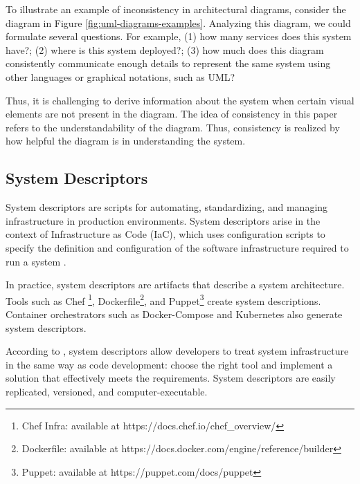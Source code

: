 \documentclass[sigconf]{acmart}
\begin{document}
To illustrate an example of inconsistency in architectural diagrams, consider the diagram in Figure \ref{fig:uml-diagrams-examples}. Analyzing this diagram, we could formulate several questions. For example, (1) how many services does this system have?; (2) where is this system deployed?; (3) how much does this diagram consistently communicate enough details to represent the same system using other languages or graphical notations, such as UML?

Thus, it is challenging to derive information about the system when certain visual elements are not present in the diagram. The idea of consistency in this paper refers to the understandability of the diagram. Thus, consistency is realized by how helpful the diagram is in understanding the system.

\subsection{System Descriptors}

System descriptors are scripts for automating, standardizing, and managing infrastructure in production environments.
System descriptors arise in the context of Infrastructure as Code (IaC), which uses configuration scripts to specify the definition and configuration of the software infrastructure required to run a system \citep{artac2017}.

In practice, system descriptors are artifacts that describe a system architecture. Tools such as Chef \footnote{Chef Infra: available at https://docs.chef.io/chef\_overview/}, Dockerfile\footnote{Dockerfile: available at https://docs.docker.com/engine/reference/builder}, and Puppet\footnote{Puppet: available at https://puppet.com/docs/puppet} create system descriptions. Container orchestrators such as Docker-Compose and Kubernetes \citep{dockercompose2019, kubernetes2020} also generate system descriptors.

According to \cite{huettermann2012}, system descriptors allow developers to treat system infrastructure in the same way as code development: choose the right tool and implement a solution that effectively meets the requirements. System descriptors are easily replicated, versioned, and computer-executable.

\end{document}
